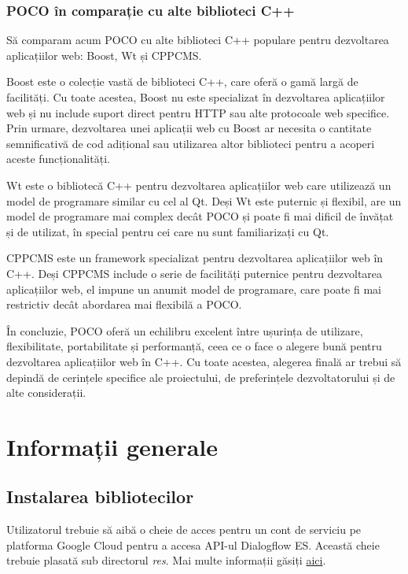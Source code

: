 \subsection{POCO în comparație cu alte biblioteci C++}

Să comparam acum POCO cu alte biblioteci C++ populare pentru dezvoltarea aplicațiilor web: Boost, Wt și CPPCMS.

Boost este o colecție vastă de biblioteci C++, care oferă o gamă largă de facilități. Cu toate acestea, Boost nu este specializat în dezvoltarea aplicațiilor web și nu include suport direct pentru HTTP sau alte protocoale web specifice. Prin urmare, dezvoltarea unei aplicații web cu Boost ar necesita o cantitate semnificativă de cod adițional sau utilizarea altor biblioteci pentru a acoperi aceste funcționalități.

Wt este o bibliotecă C++ pentru dezvoltarea aplicațiilor web care utilizează un model de programare similar cu cel al Qt. Deși Wt este puternic și flexibil, are un model de programare mai complex decât POCO și poate fi mai dificil de învățat și de utilizat, în special pentru cei care nu sunt familiarizați cu Qt.

CPPCMS este un framework specializat pentru dezvoltarea aplicațiilor web în C++. Deși CPPCMS include o serie de facilități puternice pentru dezvoltarea aplicațiilor web, el impune un anumit model de programare, care poate fi mai restrictiv decât abordarea mai flexibilă a POCO.

În concluzie, POCO oferă un echilibru excelent între ușurința de utilizare, flexibilitate, portabilitate și performanță, ceea ce o face o alegere bună pentru dezvoltarea aplicațiilor web în C++. Cu toate acestea, alegerea finală ar trebui să depindă de cerințele specifice ale proiectului, de preferințele dezvoltatorului și de alte considerații.

\chapter{Informații generale}

\section{Instalarea bibliotecilor}
Utilizatorul trebuie să aibă o cheie de acces pentru un cont de serviciu pe platforma Google Cloud pentru a accesa API-ul Dialogflow ES. Această cheie trebuie plasată sub directorul \emph{res}. Mai multe informații găsiți \href{https://cloud.google.com/iam/docs/keys-create-delete}{aici}.

